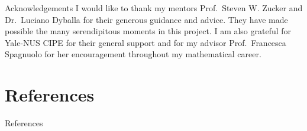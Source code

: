 \documentclass[xcolor={dvipsnames,svgnames}]{beamer}
\begin{document}

\begin{frame}{Acknowledgements}
    I would like to thank my mentors Prof.~Steven W. Zucker and Dr.~Luciano Dyballa for their generous guidance and advice. They have made possible the many serendipitous moments in this project. I am also grateful for Yale-NUS CIPE for their general support and for my advisor Prof.~Francesca Spagnuolo for her encouragement throughout my mathematical career.
\end{frame}

\section{References}
\begin{frame}{References}


\end{frame}
\end{document}
